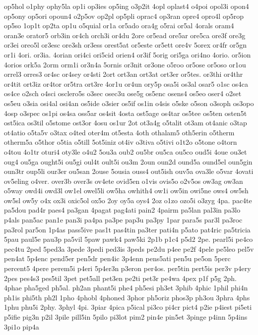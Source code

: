 {op5hol
o1phy
ophy5la
op1i
op3ies
op5ing
o3p2it
4opl
oplast4
o4poi
opol3i
opon4
op5ony
op5ori
opoun4
o2p5ov
op2pl
op5pli
oprac4
op3ran
opre4
opro4l
op5rop
op5so
1op1t
op2ta
op1u
o5quial
or1a
or5ado
ora4g
o5rai
or5al
4orals
oram4
oran3e
orator5
orb3in
or4ch
orch3i
or4du
2ore
or5ead
ore5ar
ore5ca
ore3f
ore3g
or3ei
oreo5l
or3esc
ore3sh
or3ess
orest5at
or5este
or5ett
ore4v
5orex
or4fr
or5gn
or1i
4ori.
or3ia.
4orian
ori4ci
ori5cid
orien4
or3if
5orig
ori5ga
ori4no
4orio.
or5ion
4orios
ork5a
2orm
orm1i
or3n4a
5ornis
or3nit
or3one
o5roo
or5ose
or5oso
or1ou
orrel3
orres3
or4sc
or4sey
or4sti
2ort
ort3an
ort3at
ort3er
or5tes.
or3thi
or4thr
or4tit
ort3iz
or4tor
or5tra
ort3re
4or1u
or4un
ory5p
osa5i
os3al
osar5
o1sc
os4ca
os4ce
o2sch
o4sci
osclero5s
o3sec
osec3u
ose5g
os5enc
osens4
os5eo
oser4
o2set
os5eu
o3sia
osi4al
osi4an
os5ide
o3sier
os5if
os1in
o4sis
o5ske
o5son
o3soph
os3opo
4osp
o3spec
os1pi
os4sa
oss5ar
os4sit
4osta
ost5age
os4tar
os5tee
os5ten
osten5t
ost5ica
os3til
o5stome
ost3or
4osu
os1ur
2ot
ot3a4g
o5talit
ot3am
ot4anic
o3tap
ot4atio
o5ta5v
o3tax
o4ted
oter4m
ot5esta
4oth
othalam5
oth5erin
o5therm
otherm5a
o5thor
o5tia
o5till
5ot5iniz
ot4iv
o3tiva
o5tivi
o1t2o
o5tone
o4torn
o4tou
4o1tr
oturi4
oty3le
o4u2
5ou3a
oub2
ou5br
ou5ca
ou5co
oud5i
4oue
ou3et
oug4
ou5ga
ought5i
ou5gi
oul4t
oult5i
ou3m
2oun
oun2d
ound5a
ound5el
oun5gin
oun3tr
oup5li
our3er
ou5san
2ouse
5ousia
ouss4
out5ish
ouv5a
ova3le
o5var
4ovati
ov5eling
o4ver.
over3b
over3s
ov4ete
ovid5en
o1vis
ovis5o
o2v5os
ow3ag
ow3an
o5way
owd4i
owd3l
ow1el
owel5li
ow5ha
owhith4
ow1i
ow5in
owi5ne
ows4
ow5sh
ow5sl
ow5y
o4x
ox3i
oxic5ol
ox5o
2oy
oy5a
oys4
2oz
o1zo
ozo5i
o3zyg
4pa.
pac4te
pa5dou
pad4r
paes4
pa3gan
4pagat
pag4ati
pain2
4pairm
pa5lan
pal3in
pa3lo
p4als
pan5ac
pan1e
pan3i
pa4pa
pa3pe
pap3u
pa3py
1par
para5s
par3l
pa3roc
pa3rol
par5on
1p4as
pass5ive
pas1t
pas4tin
pa3ter
pati4n
p5ato
pat4ric
pa5tricia
5pau
paul5e
pau3p
pa5vil
5paw
pawk4
paw5ki
2p1b
p1c4
p5d2
2pe.
pearl5i
pe4co
pec4tu
2ped
5ped3a
3pede
3pedi
ped3is
3peds
pe2du
p4ee
pe2f
4pele
pe5leo
pel5v
pen4at
5p4enc
pend5er
pen5dr
pen4ic
3p4enn
pens5ati
pen5u
pe5on
5perc
percent5
4pere
perem5i
p4eri
5p4er3n
p3eron
per4os.
per5tin
pert5is
per3v
p4ery
2pes
pes4s3
pes5til
3pet
pet5all
pet3en
pe2ti
pet3r
pe4wa
4pex
p1f
p5g
2ph.
4phae
pha5ged
ph5al.
ph2an
phant5i
phe4
ph5esi
ph3et
3phib
4phic
1phil
phi4n
ph1is
phi5th
ph2l
1pho
4phobl
4phoned
3phor
ph5oriz
phos3p
ph3ou
3phra
4phs
1phu
phu5i
2phy.
3phyl
4pi.
3piar
4pica
p5ical
pi3co
pi4cr
pict4
p2ie
p4iest
pi5eti
p5ifie
pig3n
p2il
3pile
pill5in
5pilo
pi3lot
pim2
pin4e
pin5et
3pinge
p4inn
5p4ins
3pi1o
pip4a
}
